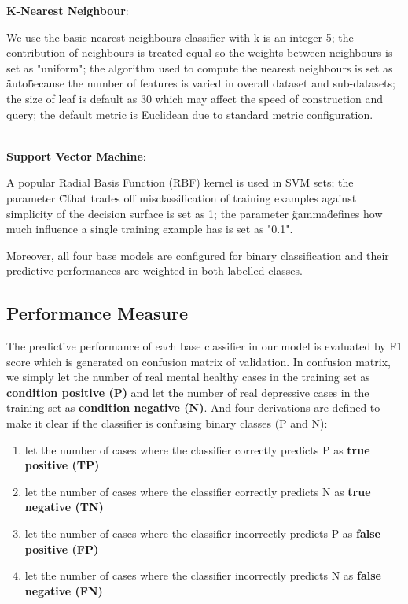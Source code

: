 \documentclass[12pt]{article}
\begin{document}
	\textbf{K-Nearest Neighbour}: 
	\begin{description} 
		 \item \hspace{0.5cm} We use the basic nearest neighbours classifier with k is an integer 5; 
		 the contribution of neighbours is treated equal so the weights between neighbours is set as "uniform"; 
		 the algorithm used to compute the nearest neighbours is set as \"auto\" because the number of features is varied in overall dataset and sub-datasets;
		 the size of leaf is default as 30 which may affect the speed of construction and query; 
		 the default metric is Euclidean due to standard metric configuration.\\\\
	\end{description}
	
	\textbf{Support Vector Machine}: 
	\begin{description} 
		 \item \hspace{0.5cm} A popular Radial Basis Function (RBF) kernel is used in SVM sets; 
		  the parameter \"C\" that trades off misclassification of training examples against simplicity of the decision surface is set as 1; 
		  the parameter \"gamma\" defines how much influence a single training example has is set as "0.1". 
	\end{description}

Moreover, all four base models are configured for binary classification and their predictive performances are weighted in both labelled classes. 
\medskip
%
%
\subsection{Performance Measure}
The predictive performance of each base classifier in our model is evaluated by F1 score which is generated on confusion matrix of validation. In confusion matrix, we simply let the number of real mental healthy cases in the training set as \textbf{condition positive (P)} and let the number of real depressive cases in the training set as  \textbf{condition negative (N)}. And four derivations are defined to make it clear if the classifier is confusing binary classes (P and N):  \\
\begin{enumerate}[label=(\roman*)]
\item let the number of cases where the classifier correctly predicts P as \textbf{ true positive (TP)}
\item let the number of cases where the classifier correctly predicts N as \textbf{true negative (TN)}
\item let the number of cases where the classifier incorrectly predicts P as \textbf{false positive (FP)}
\item let the number of cases where the classifier incorrectly predicts N as \textbf{false negative (FN)}
\end{enumerate}
\end{document}
